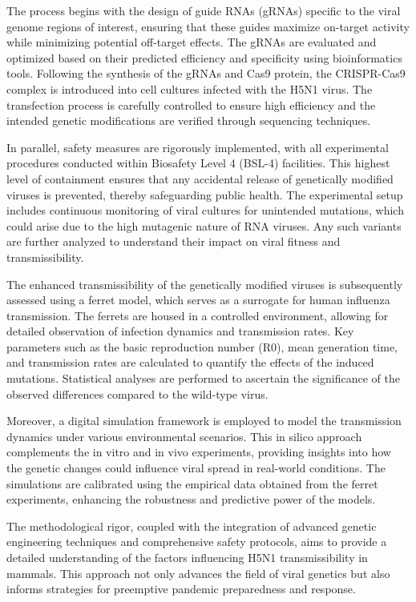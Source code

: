 \documentclass{article}
\begin{document}
The process begins with the design of guide RNAs (gRNAs) specific to the viral genome regions of interest, ensuring that these guides maximize on-target activity while minimizing potential off-target effects. The gRNAs are evaluated and optimized based on their predicted efficiency and specificity using bioinformatics tools. Following the synthesis of the gRNAs and Cas9 protein, the CRISPR-Cas9 complex is introduced into cell cultures infected with the H5N1 virus. The transfection process is carefully controlled to ensure high efficiency and the intended genetic modifications are verified through sequencing techniques.

In parallel, safety measures are rigorously implemented, with all experimental procedures conducted within Biosafety Level 4 (BSL-4) facilities. This highest level of containment ensures that any accidental release of genetically modified viruses is prevented, thereby safeguarding public health. The experimental setup includes continuous monitoring of viral cultures for unintended mutations, which could arise due to the high mutagenic nature of RNA viruses. Any such variants are further analyzed to understand their impact on viral fitness and transmissibility.

The enhanced transmissibility of the genetically modified viruses is subsequently assessed using a ferret model, which serves as a surrogate for human influenza transmission. The ferrets are housed in a controlled environment, allowing for detailed observation of infection dynamics and transmission rates. Key parameters such as the basic reproduction number (R0), mean generation time, and transmission rates are calculated to quantify the effects of the induced mutations. Statistical analyses are performed to ascertain the significance of the observed differences compared to the wild-type virus.

Moreover, a digital simulation framework is employed to model the transmission dynamics under various environmental scenarios. This in silico approach complements the in vitro and in vivo experiments, providing insights into how the genetic changes could influence viral spread in real-world conditions. The simulations are calibrated using the empirical data obtained from the ferret experiments, enhancing the robustness and predictive power of the models.

The methodological rigor, coupled with the integration of advanced genetic engineering techniques and comprehensive safety protocols, aims to provide a detailed understanding of the factors influencing H5N1 transmissibility in mammals. This approach not only advances the field of viral genetics but also informs strategies for preemptive pandemic preparedness and response.
\end{document}

